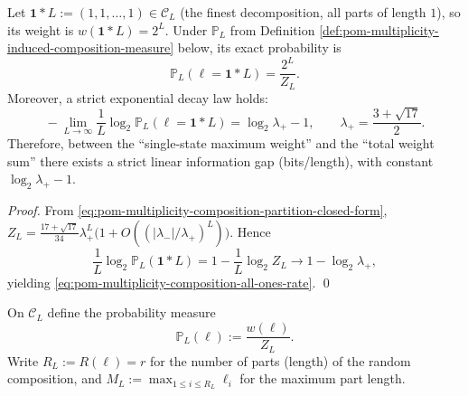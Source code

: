 \begin{corollary}\label{cor:pom-multiplicity-composition-all-ones-exponential-rarity}
Let \(\boldsymbol{1}*L:=(1,1,\dots,1)\in\mathcal{C}_L\) (the finest decomposition, all parts of length \(1\)), so its weight is \(w(\boldsymbol{1}*L)=2^L\).
Under \(\mathbb{P}_L\) from Definition \ref{def:pom-multiplicity-induced-composition-measure} below, its exact probability is
\[
\mathbb{P}_L(\boldsymbol{\ell}=\boldsymbol{1}*L)=\frac{2^L}{Z_L}.
\]
Moreover, a strict exponential decay law holds:
\begin{equation}\label{eq:pom-multiplicity-composition-all-ones-rate}
\boxed{\;
-\lim_{L\to\infty}\frac1L\log_2\mathbb{P}_L(\boldsymbol{\ell}=\boldsymbol{1}*L)
=\log_2\lambda_+-1,
\qquad \lambda_+=\frac{3+\sqrt{17}}{2}.\;}
\end{equation}
Therefore, between the ``single-state maximum weight'' and the ``total weight sum'' there exists a strict linear information gap (bits/length), with constant \(\log_2\lambda_+-1\).
\end{corollary}
\begin{proof}
From \eqref{eq:pom-multiplicity-composition-partition-closed-form},
\(
Z_L=\frac{17+\sqrt{17}}{34}\lambda_+^L\bigl(1+O((|\lambda_-|/\lambda_+)^L)\bigr)
\).
Hence
\[
\frac1L\log_2\mathbb{P}_L(\boldsymbol{1}*L)
=1-\frac1L\log_2 Z_L
\longrightarrow
1-\log_2\lambda_+,
\]
yielding \eqref{eq:pom-multiplicity-composition-all-ones-rate}. \qed
\end{proof}

\begin{definition}\label{def:pom-multiplicity-induced-composition-measure}
On \(\mathcal{C}_L\) define the probability measure
\[
\mathbb{P}_L(\boldsymbol{\ell})
:=\frac{w(\boldsymbol{\ell})}{Z_L}.
\]
Write \(R_L:=R(\boldsymbol{\ell})=r\) for the number of parts (length) of the random composition, and \(M_L:=\max_{1\le i\le R_L}\ell_i\) for the maximum part length.
\end{definition}

